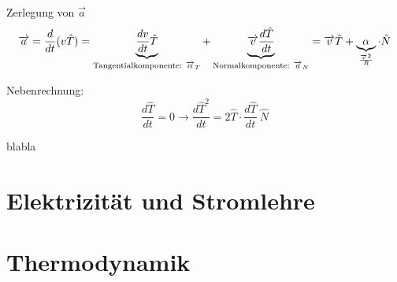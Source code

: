 \documentclass[a4paper,10pt]{scrartcl}
\begin{document}
\begin{seg}{Zerlegung von $\vec a$}
\[
  \overrightarrow{a} = \frac{d}{dt} (v \hat T)=\underbrace{\frac{dv}{dt} \hat T}_{\text{Tangentialkomponente: }\overrightarrow{\alpha}_T}+ 
 \underbrace{\overrightarrow{v} \frac{d\hat T}{dt}}_{\text{Normalkomponente: }\overrightarrow{a}_N}
=\overrightarrow{v} \hat T + \underbrace{\alpha}_{\frac{\overrightarrow{v}^2}{R}} \cdot \hat N
 \]

Nebenrechnung:
 \[
 \frac{d\hat T}{dt}=0 \rightarrow \frac{{d\hat{T}}^2}{{dt}}= 2 \hat T\cdot \frac{d\hat T}{dt} ~ \hat N
 \]



\begin{ex}
 blabla
\end{ex}


\end{seg}






\section{Elektrizität und Stromlehre}

\section{Thermodynamik}
\end{document}
